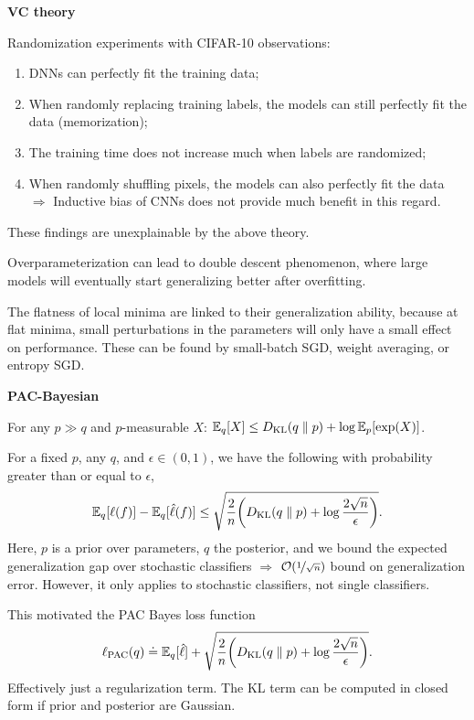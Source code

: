 \documentclass[10pt]{article}
\newenvironment{topic}[1]
{\textbf{\sffamily \footnotesize \colorbox{black}{\rlap{\textbf{\textcolor{white}{#1}}}\hspace{\linewidth}\hspace{-2\fboxsep}}}}
{}
\newenvironment{subtopic}[1]
{\begin{center}\textbf{\footnotesize \sffamily #1}\end{center}}
{}
\begin{document}
\begin{multicols*}{3}
\begin{topic}{Statistical learning theory}
\begin{subtopic}{VC theory}
            Randomization experiments with CIFAR-10 observations:
            \begin{enumerate}[left=0pt]
                \item DNNs can perfectly fit the training data;
                \item When randomly replacing training labels, the models can still perfectly fit the data
                      (memorization);
                \item The training time does not increase much when labels are randomized;
                \item When randomly shuffling pixels, the models can also perfectly fit the data $\Rightarrow$ Inductive bias of
                      CNNs does not provide much benefit in this regard.
            \end{enumerate}
            These findings are unexplainable by the above theory.

            Overparameterization can lead to double descent phenomenon, where large models will eventually
            start generalizing better after overfitting.

            The flatness of local minima are linked to their generalization ability, because at flat minima,
            small perturbations in the parameters will only have a small effect on performance. These can be
            found by small-batch SGD, weight averaging, or entropy SGD.
        \end{subtopic}

        \begin{subtopic}{PAC-Bayesian}
            For any $p \gg q$ and $p$-measurable $X$: $\mathbb{E}_q[X] \leq D_{\mathrm{KL}}(q \;\|\; p) + \log \mathbb{E}_p[\exp(X)]$.

            For a fixed $p$, any $q$, and $\epsilon \in (0,1)$, we have the following with probability greater
            than or equal to $\epsilon$, \[
                \E_q[\ell(f)] - \E_q[\hat{\ell}(f)] \leq \sqrt{\frac{2}{n} \lft( D_{\mathrm{KL}}(q \;\|\; p) + \log \frac{2 \sqrt{n}}{\epsilon} \rgt)}.
            \]
            Here, $p$ is a prior over parameters, $q$ the posterior, and we bound the expected generalization
            gap over stochastic classifiers $\Rightarrow$ $\bigo{\nicefrac{1}{\sqrt{n}}}$ bound on generalization
            error. However, it only applies to stochastic classifiers, not single classifiers.

            This motivated the PAC Bayes loss function \[
                \ell_{\mathrm{PAC}}(q) \doteq \E_q[\hat{\ell}] + \sqrt{\frac{2}{n} \lft( D_{\mathrm{KL}}(q \;\|\; p) + \log \frac{2\sqrt{n}}{\epsilon} \rgt)}.
            \]
            Effectively just a regularization term. The KL term can be computed in closed form if prior and
            posterior are Gaussian.
        \end{subtopic}


\end{topic}
\end{multicols*}
\end{document}
